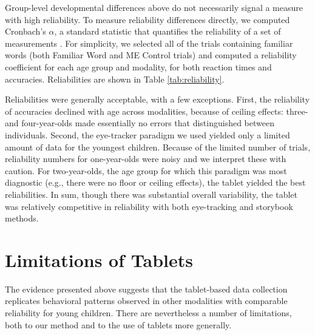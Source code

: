 \documentclass[man,noapacite]{apa2}
\begin{document}
Group-level developmental differences above do not necessarily signal a measure with high reliability. To measure reliability differences directly, we computed Cronbach's $\alpha$, a standard statistic that quantifies the reliability of a set of measurements \cite{santos1999}. For simplicity, we selected all of the trials containing familiar words (both Familiar Word and ME Control trials) and computed a reliability coefficient for each age group and modality, for both reaction times and accuracies. Reliabilities are shown in Table \ref{tab:reliability}. 

Reliabilities were generally acceptable, with a few exceptions. First, the reliability of accuracies declined with age across modalities, because of ceiling effects: three- and four-year-olds made essentially no errors that distinguished between individuals. Second, the eye-tracker paradigm we used yielded only a limited amount of data for the youngest children. Because of the limited number of trials, reliability numbers for one-year-olds were noisy and we interpret these with caution. For two-year-olds, the age group for which this paradigm was most diagnostic (e.g., there were no floor or ceiling effects), the tablet yielded the best reliabilities. In sum, though there was substantial overall variability, the tablet was relatively competitive in reliability with both eye-tracking and storybook methods. 

\section{Limitations of Tablets}


The evidence presented above suggests that the tablet-based data collection replicates behavioral patterns observed in other modalities with comparable reliability for young children. There are nevertheless a number of limitations, both to our method and to the use of tablets more generally. 

\end{document}
